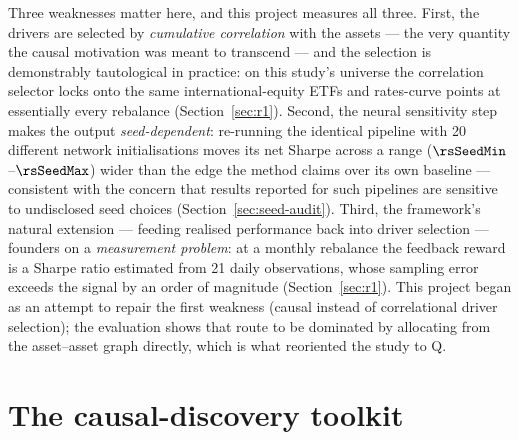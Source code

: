 Three weaknesses matter here, and this project measures all three. First, the
drivers are selected by \emph{cumulative correlation} with the assets --- the
very quantity the causal motivation was meant to transcend --- and the
selection is demonstrably tautological in practice: on this study's universe
the correlation selector locks onto the same international-equity ETFs and
rates-curve points at essentially every rebalance
(Section~\ref{sec:r1}). Second, the neural sensitivity step makes the
output \emph{seed-dependent}: re-running the identical pipeline with 20
different network initialisations moves its net Sharpe across a range
($\rsSeedMin$--$\rsSeedMax$) wider than the edge the method claims over its
own baseline --- consistent with the concern that results reported for such
pipelines are sensitive to undisclosed seed choices
(Section~\ref{sec:seed-audit}). Third, the framework's natural extension ---
feeding realised performance back into driver selection --- founders on a
\emph{measurement problem}: at a monthly rebalance the feedback reward is a
Sharpe ratio estimated from 21 daily observations, whose sampling error
exceeds the signal by an order of magnitude (Section~\ref{sec:r1}). This
project began as an attempt to repair the first weakness (causal instead of
correlational driver selection); the evaluation shows that route to be
dominated by allocating from the asset--asset graph directly, which is what
reoriented the study to Q.

\section{The causal-discovery toolkit}
\label{sec:cd-tools}

